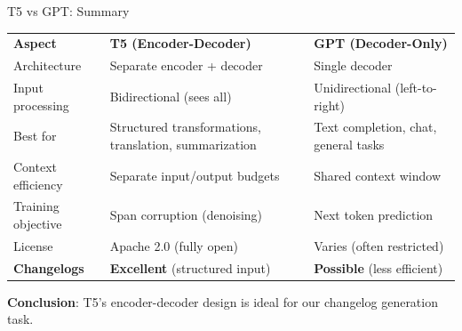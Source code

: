\begin{frame}{T5 vs GPT: Summary}
\begin{center}
\begin{tabular}{l|p{4.5cm}|p{4.5cm}}
\textbf{Aspect} & \textbf{T5 (Encoder-Decoder)} & \textbf{GPT (Decoder-Only)} \\
Architecture & Separate encoder + decoder & Single decoder \\
Input processing & Bidirectional (sees all) & Unidirectional (left-to-right) \\
Best for & Structured transformations, translation, summarization & Text completion, chat, general tasks \\
Context efficiency & Separate input/output budgets & Shared context window \\
Training objective & Span corruption (denoising) & Next token prediction \\
License & Apache 2.0 (fully open) & Varies (often restricted) \\
\textbf{Changelogs} & \textbf{Excellent} (structured input) & \textbf{Possible} (less efficient) \\
\end{tabular}
\end{center}

\vspace{0.5cm}
\textbf{Conclusion}: T5's encoder-decoder design is ideal for our changelog generation task.
\end{frame}

